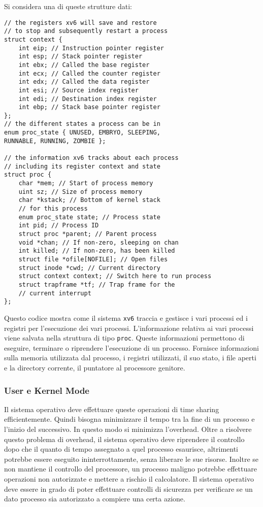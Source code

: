 \documentclass{article}
\numberwithin{equation}{subsection}
\begin{document}
Si considera una di queste strutture dati:
\begin{verbatim}
// the registers xv6 will save and restore
// to stop and subsequently restart a process
struct context {
	int eip; // Instruction pointer register
	int esp; // Stack pointer register
	int ebx; // Called the base register
	int ecx; // Called the counter register
	int edx; // Called the data register
	int esi; // Source index register
	int edi; // Destination index register
	int ebp; // Stack base pointer register
};
// the different states a process can be in
enum proc_state { UNUSED, EMBRYO, SLEEPING,
RUNNABLE, RUNNING, ZOMBIE };

// the information xv6 tracks about each process
// including its register context and state
struct proc {
	char *mem; // Start of process memory
	uint sz; // Size of process memory
	char *kstack; // Bottom of kernel stack
	// for this process
	enum proc_state state; // Process state
	int pid; // Process ID
	struct proc *parent; // Parent process
	void *chan; // If non-zero, sleeping on chan
	int killed; // If non-zero, has been killed
	struct file *ofile[NOFILE]; // Open files
	struct inode *cwd; // Current directory
	struct context context; // Switch here to run process
	struct trapframe *tf; // Trap frame for the
	// current interrupt
};
\end{verbatim}

Questo codice mostra come il sistema \verb|xv6| traccia e gestisce i vari processi ed i registri per l'esecuzione dei vari processi. L'informazione relativa ai 
vari processi viene salvata nella struttura di tipo \verb|proc|. Queste informazioni permettono di eseguire, terminare o riprendere l'esecuzione di un processo. Fornisce 
informazioni sulla memoria utilizzata dal processo, i registri utilizzati, il suo stato, i file aperti e la directory corrente, il puntatore al processore genitore. 

\subsubsection{User e Kernel Mode}

Il sistema operativo deve effettuare queste operazioni di time sharing efficientemente. Quindi bisogna minimizzare il tempo tra la fine di un processo e l'inizio del 
successivo. In questo modo si minimizza l'overhead. Oltre a risolvere questo problema di overhead, il sistema operativo deve riprendere il controllo dopo che il quanto 
di tempo assegnato a quel processo esaurisce, altrimenti potrebbe essere eseguito ininterrottamente, senza liberare le sue risorse. Inoltre se non mantiene il controllo 
del processore, un processo maligno potrebbe effettuare operazioni non autorizzate e mettere a rischio il calcolatore. Il sistema operativo deve essere in grado di 
poter effettuare controlli di sicurezza per verificare se un dato processo sia autorizzato a compiere una certa azione. 
\end{document}
